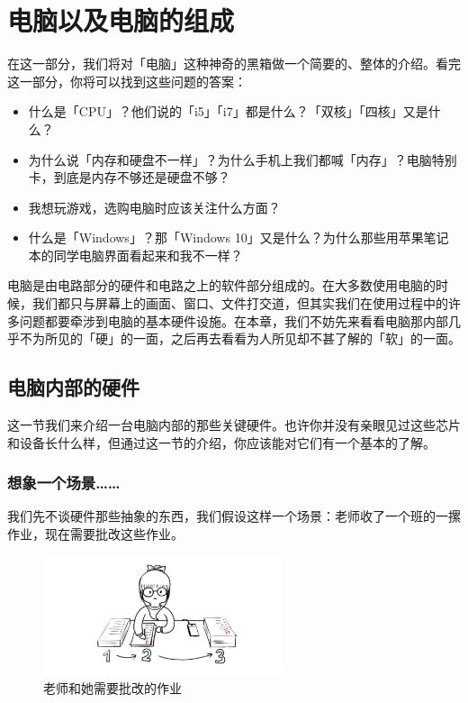 \chapter{电脑以及电脑的组成}
\label{computer-and-its-components}

\begin{intro}
  在这一部分，我们将对「电脑」这种神奇的黑箱做一个简要的、整体的介绍。看完这一部分，你将可以找到这些问题的答案：

  \begin{itemize}
    \item 什么是「CPU」？他们说的「i5」「i7」都是什么？「双核」「四核」又是什么？
    \item 为什么说「内存和硬盘不一样」？为什么手机上我们都喊「内存」？电脑特别卡，到底是内存不够还是硬盘不够？
    \item 我想玩游戏，选购电脑时应该关注什么方面？
    \item 什么是「Windows」？那「Windows 10」又是什么？为什么那些用苹果笔记本的同学电脑界面看起来和我不一样？
  \end{itemize}
\end{intro}

电脑是由电路部分的硬件和电路之上的软件部分组成的。在大多数使用电脑的时候，我们都只与屏幕上的画面、窗口、文件打交道，但其实我们在使用过程中的许多问题都要牵涉到电脑的基本硬件设施。在本章，我们不妨先来看看电脑那内部几乎不为所见的「硬」的一面，之后再去看看为人所见却不甚了解的「软」的一面。

\section{电脑内部的硬件} 

这一节我们来介绍一台电脑内部的那些关键硬件。也许你并没有亲眼见过这些芯片和设备长什么样，但通过这一节的介绍，你应该能对它们有一个基本的了解。

\subsection{想象一个场景……}

我们先不谈硬件那些抽象的东西，我们假设这样一个场景：老师收了一个班的一摞作业，现在需要批改这些作业。

\begin{figure}[htb!]
  \centering
  \includegraphics[width=7cm]{assets/Teacher_and_homework.png}
  \caption{老师和她需要批改的作业}
  \label{teacher-and-homework}
\end{figure}

